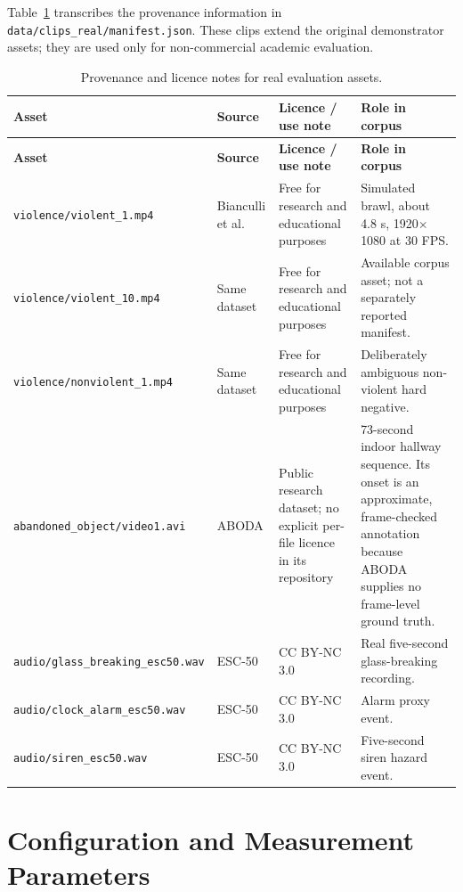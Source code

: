 Table~\ref{tab:data-provenance} transcribes the provenance information in
\texttt{data/clips\_real/manifest.json}. These clips extend the original
demonstrator assets; they are used only for non-commercial academic evaluation.

\small
\begin{longtable}{p{2.8cm}p{3.5cm}p{2.6cm}p{3.3cm}}
\caption{Provenance and licence notes for real evaluation assets.}\label{tab:data-provenance}\\
\toprule
\textbf{Asset} & \textbf{Source} & \textbf{Licence / use note} & \textbf{Role in corpus} \\
\midrule
\endfirsthead
\toprule
\textbf{Asset} & \textbf{Source} & \textbf{Licence / use note} & \textbf{Role in corpus} \\
\midrule
\endhead
\texttt{violence/violent\_1.mp4} & Bianculli et al. \cite{bianculli2020violence} & Free for research and educational purposes & Simulated brawl, about 4.8 s, 1920$\times$1080 at 30 FPS. \\
\texttt{violence/violent\_10.mp4} & Same dataset & Free for research and educational purposes & Available corpus asset; not a separately reported manifest. \\
\texttt{violence/nonviolent\_1.mp4} & Same dataset & Free for research and educational purposes & Deliberately ambiguous non-violent hard negative. \\
\texttt{abandoned\_object/video1.avi} & ABODA \cite{lin2015aboda} & Public research dataset; no explicit per-file licence in its repository & 73-second indoor hallway sequence. Its onset is an approximate, frame-checked annotation because ABODA supplies no frame-level ground truth. \\
\texttt{audio/glass\_breaking\_esc50.wav} & ESC-50 \cite{piczak2015esc50} & CC BY-NC 3.0 & Real five-second glass-breaking recording. \\
\texttt{audio/clock\_alarm\_esc50.wav} & ESC-50 \cite{piczak2015esc50} & CC BY-NC 3.0 & Alarm proxy event. \\
\texttt{audio/siren\_esc50.wav} & ESC-50 \cite{piczak2015esc50} & CC BY-NC 3.0 & Five-second siren hazard event. \\
\bottomrule
\end{longtable}
\normalsize

\chapter{Configuration and Measurement Parameters}
\label{app:config}

